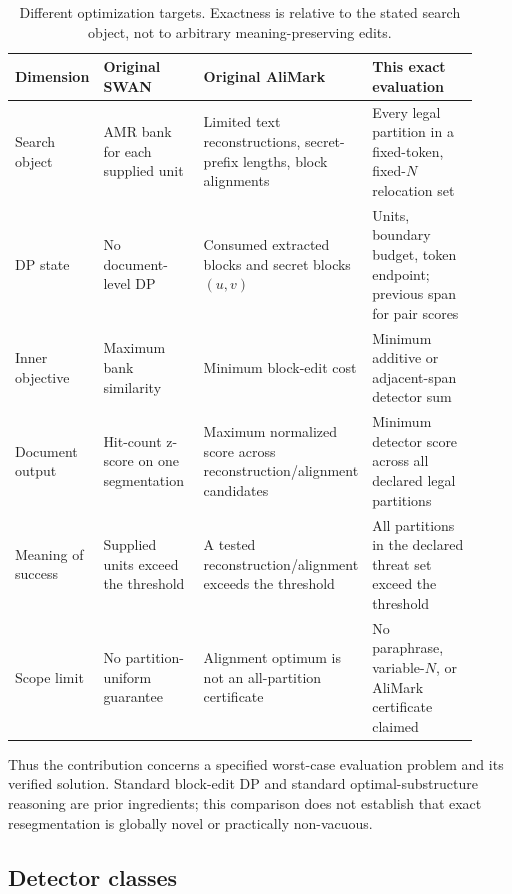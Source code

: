 \documentclass[10pt]{article}
\begin{document}
\begin{table}[t]
\caption{Different optimization targets. Exactness is relative to the
stated search object, not to arbitrary meaning-preserving edits.}
\label{tab:objectives}
\centering
\small
\setlength{\tabcolsep}{4pt}
\begin{tabular}{>{\raggedright\arraybackslash}p{0.13\linewidth}
                >{\raggedright\arraybackslash}p{0.23\linewidth}
                >{\raggedright\arraybackslash}p{0.27\linewidth}
                >{\raggedright\arraybackslash}p{0.29\linewidth}}
\toprule
Dimension & Original SWAN & Original AliMark & This exact evaluation \\
\midrule
Search object & AMR bank for each supplied unit &
Limited text reconstructions, secret-prefix lengths, block alignments &
Every legal partition in a fixed-token, fixed-$N$ relocation set \\
DP state & No document-level DP &
Consumed extracted blocks and secret blocks $(u,v)$ &
Units, boundary budget, token endpoint; previous span for pair scores \\
Inner objective & Maximum bank similarity &
Minimum block-edit cost &
Minimum additive or adjacent-span detector sum \\
Document output & Hit-count z-score on one segmentation &
Maximum normalized score across reconstruction/alignment candidates &
Minimum detector score across all declared legal partitions \\
Meaning of success & Supplied units exceed the threshold &
A tested reconstruction/alignment exceeds the threshold &
All partitions in the declared threat set exceed the threshold \\
Scope limit & No partition-uniform guarantee &
Alignment optimum is not an all-partition certificate &
No paraphrase, variable-$N$, or AliMark certificate claimed \\
\bottomrule
\end{tabular}
\end{table}

Thus the contribution concerns a specified worst-case evaluation problem
and its verified solution. Standard block-edit DP and standard
optimal-substructure reasoning are prior ingredients; this comparison does
not establish that exact resegmentation is globally novel or practically
non-vacuous.

\subsection{Detector classes}
\end{document}

